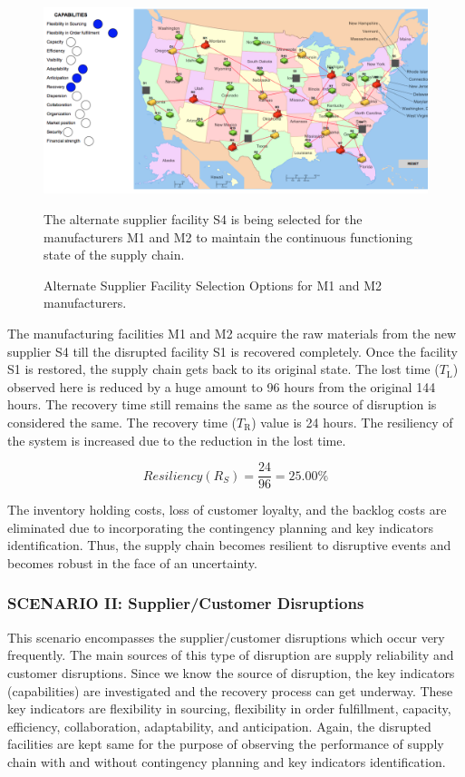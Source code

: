 \begin{figure}[H]
  \centering
  \includegraphics[width=6.5in]{figures/pdf/ALTS.png}\\
  \caption{Alternate Supplier Facility Selection Options for M1 and M2 manufacturers.}
  {The alternate supplier facility S4 is being selected for the manufacturers M1 and M2 to maintain the continuous functioning state of the supply chain.}
  \label{ALTS}
\end{figure}    

The manufacturing facilities M1 and M2 acquire the raw materials from the new supplier S4 till the disrupted facility S1 is recovered completely. Once the facility S1 is restored, the supply chain gets back to its original state.
The lost time ($T_{\text{L}}$) observed here is reduced by a huge amount to 96 hours from the original 144 hours. The recovery time still remains the same as the source of disruption is considered the same. The recovery time ($T_{\text{R}}$) value is 24 hours. The resiliency of the system is increased due to the reduction in the lost time. 

\begin{equation}
    Resiliency(R_S) = \frac{24}{96} = 25.00 \% \label{3.19}
\end{equation}

The inventory holding costs, loss of customer loyalty, and the backlog costs are eliminated due to incorporating the contingency planning and key indicators identification. Thus, the supply chain becomes resilient to disruptive events and becomes robust in the face of an uncertainty.

\newpage
\subsubsection{SCENARIO II: Supplier/Customer Disruptions}

This scenario encompasses the supplier/customer disruptions which occur very frequently. The main sources of this type of disruption are supply reliability and customer disruptions. Since we know the source of disruption, the key indicators (capabilities) are investigated and the recovery process can get underway. These key indicators are flexibility in sourcing, flexibility in order fulfillment, capacity, efficiency, collaboration, adaptability, and anticipation. Again, the disrupted facilities are kept same for the purpose of observing the performance of supply chain with and without contingency planning and key indicators identification. 

